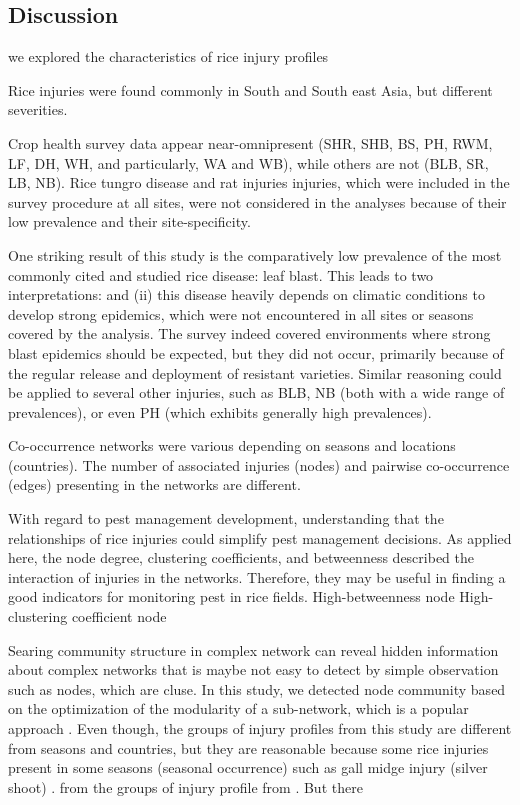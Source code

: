 \subsection{Discussion}

we explored the characteristics of rice injury profiles

Rice injuries were found commonly in South and South east Asia, but different severities.

Crop health survey data
 appear near-omnipresent (SHR, SHB, BS, PH, RWM, LF, DH, WH, and particularly, WA and WB), while others are not (BLB, SR, LB, NB). Rice tungro disease and rat injuries injuries, which were included in the survey procedure at all sites, were not considered in the analyses because of their low prevalence and their site-specificity. 

One striking result of this study is the comparatively low prevalence of the most commonly cited and studied rice disease: leaf blast. This leads to two interpretations: and (ii) this disease heavily depends on climatic conditions to develop strong epidemics, which were not encountered in all sites or seasons covered by the analysis. The survey indeed covered environments where strong blast epidemics should be expected, but they did not occur, primarily because of the regular release and deployment of resistant varieties. Similar reasoning could be applied to several other injuries, such as BLB, NB (both with a wide range of prevalences), or even PH (which exhibits generally high prevalences).

Co-occurrence networks were various depending on seasons and locations (countries). The number of associated injuries (nodes) and pairwise co-occurrence (edges) presenting in the networks are different.

With regard to pest management development, understanding that the relationships of rice injuries could simplify pest management decisions. As applied here, the node degree, clustering coefficients, and betweenness described the interaction of injuries in the networks. Therefore, they may be useful in finding a good indicators for monitoring pest in rice fields. High-betweenness node High- clustering coefficient node 



Searing community structure in complex network can reveal hidden information about complex networks that is maybe not easy to detect by simple observation such as nodes, which are cluse. In this study, we detected node community based on the optimization of the modularity of a sub-network, which is a popular approach \cite{Liu_2014_Detecting}. Even though, the groups of injury profiles from this study are different from seasons and countries, but they are reasonable because some rice injuries present in some seasons (seasonal occurrence) such as gall midge injury (silver shoot) \cite{Krishnaiah_2004_Rice}. from the groups of injury profile from \cite{Savary_2000_Characterization}. But there 


